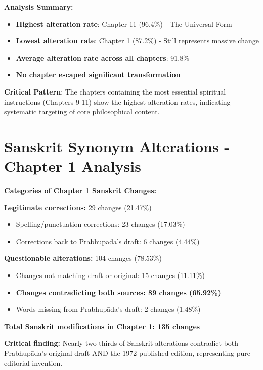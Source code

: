 \documentclass[11pt,twoside]{book}
\begin{document}
\normalsize

\textbf{\textbf{Analysis Summary:}}
\begin{itemize}
\item \textbf{\textbf{Highest alteration rate}}: Chapter 11 (96.4\%) - The Universal Form
\item \textbf{\textbf{Lowest alteration rate}}: Chapter 1 (87.2\%) - Still represents massive change
\item \textbf{\textbf{Average alteration rate across all chapters}}: 91.8\%
\item \textbf{\textbf{No chapter escaped significant transformation}}
\end{itemize}

\textbf{\textbf{Critical Pattern}}: The chapters containing the most essential spiritual instructions (Chapters 9-11) show the highest alteration rates, indicating systematic targeting of core philosophical content.
\section*{Sanskrit Synonym Alterations - Chapter 1 Analysis}
\label{sec:orgbdcea48}

\textbf{\textbf{Categories of Chapter 1 Sanskrit Changes:}}

\textbf{\textbf{Legitimate corrections:}} 29 changes (21.47\%)
\begin{itemize}
\item Spelling/punctuation corrections: 23 changes (17.03\%)
\item Corrections back to Prabhupāda's draft: 6 changes (4.44\%)
\end{itemize}

\textbf{\textbf{Questionable alterations:}} 104 changes (78.53\%)  
\begin{itemize}
\item Changes not matching draft or original: 15 changes (11.11\%)
\item \textbf{\textbf{Changes contradicting both sources: 89 changes (65.92\%)}}
\item Words missing from Prabhupāda's draft: 2 changes (1.48\%)
\end{itemize}

\textbf{\textbf{Total Sanskrit modifications in Chapter 1: 135 changes}}

\textbf{\textbf{Critical finding:}} Nearly two-thirds of Sanskrit alterations contradict both Prabhupāda's original draft AND the 1972 published edition, representing pure editorial invention.
\end{document}
